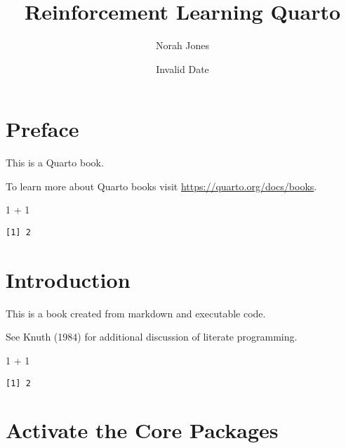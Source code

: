 \documentclass[
  letterpaper,
  DIV=11,
  numbers=noendperiod]{scrreprt}
\title{Reinforcement Learning Quarto}
\author{Norah Jones}
\date{Invalid Date}
\newenvironment{Shaded}{\begin{snugshade}}{\end{snugshade}}
\newcommand{\DecValTok}[1]{\textcolor[rgb]{0.68,0.00,0.00}{#1}}
\newcommand{\SpecialCharTok}[1]{\textcolor[rgb]{0.37,0.37,0.37}{#1}}
\renewcommand*\contentsname{Table of contents}
\newcommand\contentsname{Table of contents}
\begin{document}
\maketitle

\renewcommand*\contentsname{Table of contents}
{
\hypersetup{linkcolor=}
\setcounter{tocdepth}{2}
\tableofcontents
}


\chapter*{Preface}\label{preface}


This is a Quarto book.

To learn more about Quarto books visit
\url{https://quarto.org/docs/books}.

\begin{Shaded}
\begin{Highlighting}[]
\DecValTok{1} \SpecialCharTok{+} \DecValTok{1}
\end{Highlighting}
\end{Shaded}

\begin{verbatim}
[1] 2
\end{verbatim}


\chapter{Introduction}\label{introduction}

This is a book created from markdown and executable code.

See Knuth (1984) for additional discussion of literate programming.

\begin{Shaded}
\begin{Highlighting}[]
\DecValTok{1} \SpecialCharTok{+} \DecValTok{1}
\end{Highlighting}
\end{Shaded}

\begin{verbatim}
[1] 2
\end{verbatim}


\chapter{Activate the Core Packages}\label{activate-the-core-packages}
\end{document}
